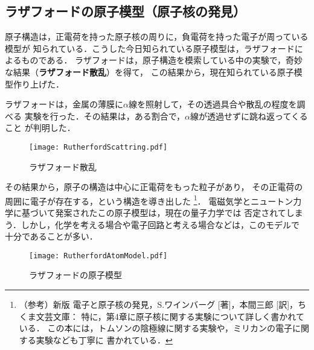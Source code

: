         \subsection{ラザフォードの原子模型（原子核の発見）}
            原子構造は，正電荷を持った原子核の周りに，負電荷を持った電子が周っている模型が
            知られている．こうした今日知られている原子模型は，ラザフォードによるものである．
            ラザフォードは，原子構造を模索している中の実験で，奇妙な結果（\textbf{ラザフォード散乱}）を得て，
            この結果から，現在知られている原子模型作り上げた．

            ラザフォードは，金属の薄膜に$\alpha$線を照射して，その透過具合や散乱の程度を調べる
            実験を行った．その結果は，ある割合で，$\alpha$線が透過せずに跳ね返ってくること
            が判明した．
                \begin{figure}[hbt]
                    \begin{center}
                        \texttt{[image: RutherfordScattring.pdf]}
                        \caption{ラザフォード散乱}
                        \label{fig:RutherfordScattring}
                    \end{center}
                \end{figure}

            その結果から，原子の構造は中心に正電荷をもった粒子があり，
            その正電荷の周囲に電子が存在する，という構造を導き出した
                \footnote{
                    （参考）新版 電子と原子核の発見，S.ワインバーグ [著]，本間三郎 [訳]，ちくま文芸文庫：
                     特に，第4章に原子核に関する実験について詳しく書かれている．
                     この本には，トムソンの陰極線に関する実験や，ミリカンの電子に関する実験なども丁寧に
                     書かれている．
                }．
            電磁気学とニュートン力学に基づいて発案されたこの原子模型は，現在の量子力学では
            否定されてしまう．しかし，化学を考える場合や電子回路と考える場合などは，このモデルで
            十分であることが多い．
                \begin{figure}[hbt]
                    \begin{center}
                        \texttt{[image: RutherfordAtomModel.pdf]}
                        \caption{ラザフォードの原子模型}
                        \label{fig:RutherfordAtomModel}
                    \end{center}
                \end{figure}

